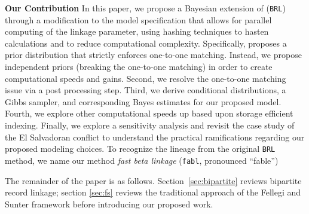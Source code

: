 \documentclass[12pt,letterpaper]{article}
\newcommand{\1}[1]{\mathbb{I}\!\left[#1\right]} %
\begin{document}
\textbf{Our Contribution} 
In this paper, we propose a Bayesian extension of \cite{sadinle_bayesian_2017} (\texttt{BRL}) through a modification to the model specification that allows for parallel computing of the linkage parameter, using hashing techniques to hasten calculations and to reduce computational complexity.  Specifically, \cite{sadinle_bayesian_2017} proposes a prior distribution that strictly enforces one-to-one matching. Instead, we propose independent priors (breaking the one-to-one matching) in order to create computational speeds and gains. Second, we resolve the one-to-one matching issue via a post processing step. Third, we derive conditional distributions, a Gibbs sampler, and corresponding Bayes estimates for our proposed model. Fourth, we explore other computational speeds up based upon storage efficient indexing. Finally, we explore a sensitivity analysis and revisit the case study of the El Salvadoran conflict to understand the practical ramifications regarding our proposed modeling choices. 
To recognize the lineage from the original \texttt{BRL} method, we name our method \emph{fast beta linkage} (\texttt{fabl},
pronounced ``fable'')

The remainder of the paper is as follows. Section~\ref{sec:bipartite} reviews bipartite record linkage; section \ref{sec:fs} reviews the traditional approach of the Fellegi and Sunter framework before introducing our proposed work. 
\end{document}
